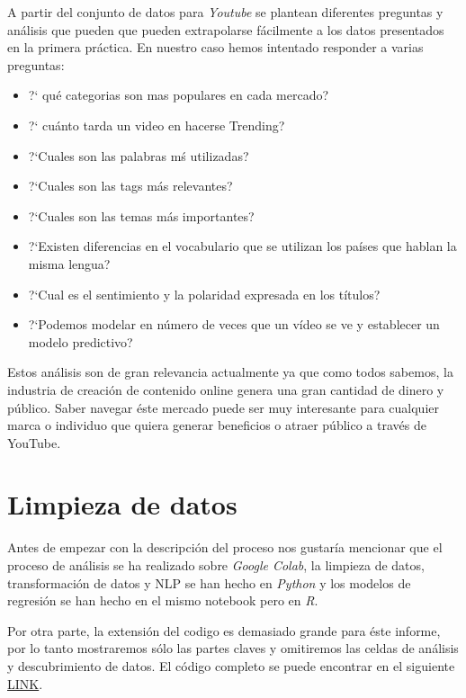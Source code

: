 \documentclass[a4paper,12pt]{article}
\begin{document}
A partir del conjunto de datos para  {\itshape Youtube}  se plantean diferentes preguntas y an\'alisis que pueden que pueden extrapolarse f\'acilmente a los datos presentados en la primera pr\'actica. En nuestro caso hemos intentado responder a varias preguntas:

\begin{itemize}

\item  ?` qu\'e categorias son mas populares en cada mercado?
\item ?` cu\'anto tarda un video en hacerse Trending?
\item ?`Cuales son las palabras m\'s utilizadas?
\item ?`Cuales son las tags m\'as relevantes?
\item ?`Cuales son las temas m\'as importantes?
\item ?`Existen diferencias en el vocabulario que se utilizan los pa\'ises que hablan la misma lengua?
\item ?`Cual es el sentimiento y la polaridad expresada en los t\'itulos?
\item ?`Podemos modelar en n\'umero de veces que un v\'ideo se ve y establecer un modelo predictivo?

\end{itemize}

Estos an\'alisis son de gran relevancia actualmente ya que como todos sabemos, la industria de creaci\'on de contenido online genera una gran cantidad de dinero y p\'ublico. Saber navegar \'este mercado puede ser muy interesante para cualquier marca o individuo que quiera generar beneficios o atraer p\'ublico a trav\'es de YouTube.


\section[item_limpieza]{Limpieza de datos}

Antes de empezar con la descripci\'on del proceso nos gustar\'ia mencionar que el proceso de an\'alisis se ha realizado sobre {\itshape Google Colab}, la limpieza de datos, transformaci\'on de datos y NLP se han hecho en {\itshape Python} y los modelos de regresi\'on se han hecho en el mismo notebook pero en {\itshape R}. 

Por otra parte, la extensi\'on del codigo es demasiado grande para \'este informe, por lo tanto mostraremos s\'olo las partes claves y omitiremos las celdas de an\'alisis y descubrimiento de datos. El c\'odigo completo se puede encontrar en el siguiente \href{https://github.com/b-suarez/youtube_stats_analysis}{LINK}.
\end{document}
